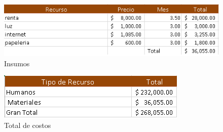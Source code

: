 \documentclass[12pt,letterpaper]{article}
\begin{document}
\begin{figure}
   \centering
   \includegraphics[scale=1.00]{tabla2.png}
   \caption{Insumos}
   \label{fig:my_label}
\end{figure}

\begin{figure}
   \centering
   \includegraphics[scale=1.00]{tabla3.png}
   \caption{Total de costos}
   \label{fig:my_label}
\end{figure}
\end{document}
